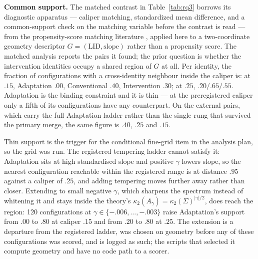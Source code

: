 \documentclass[11pt,a4paper]{article}
\begin{document}
\textbf{Common support.} The matched contrast in Table~\ref{tab:rq3} borrows its
diagnostic apparatus --- caliper matching, standardized mean difference, and a
common-support check on the matching variable before the contrast is read ---
from the propensity-score matching literature \cite{b22}, applied here to a
two-coordinate geometry descriptor $G=(\mathrm{LID},\mathrm{slope})$ rather than
a propensity score. The matched analysis reports the pairs it found; the
prior question is whether the intervention identities occupy a shared region of
$G$ at all. Per identity, the fraction of configurations with a cross-identity
neighbour inside the caliper is: at $.15$, Adaptation $.00$, Conventional $.40$,
Intervention $.30$; at $.25$, $.20/.65/.55$. Adaptation is the binding
constraint and it is thin --- at the preregistered caliper only a fifth of its
configurations have any counterpart. On the external pairs, which carry the full
Adaptation ladder rather than the single rung that survived the primary merge,
the same figure is $.40$, $.25$ and $.15$.

Thin support is the trigger for the conditional fine-grid item in the analysis
plan, so the grid was run. The registered tempering ladder cannot satisfy it:
Adaptation sits at high standardised slope and positive $\gamma$ lowers slope,
so the nearest configuration reachable within the registered range is at
distance $.95$ against a caliper of $.25$, and adding tempering moves further
away rather than closer. Extending to small negative $\gamma$, which sharpens
the spectrum instead of whitening it and stays inside the theory's
$\kappa_2(A_\gamma)=\kappa_2(\Sigma)^{|\gamma|/2}$, does reach the region: 120
configurations at $\gamma\in\{-.006,\dots,-.003\}$ raise Adaptation's support
from $.00$ to $.80$ at caliper $.15$ and from $.20$ to $.80$ at $.25$. The
extension is a departure from the registered ladder, was chosen on geometry
before any of these configurations was scored, and is logged as such; the
scripts that selected it compute geometry and have no code path to a scorer.
\end{document}
